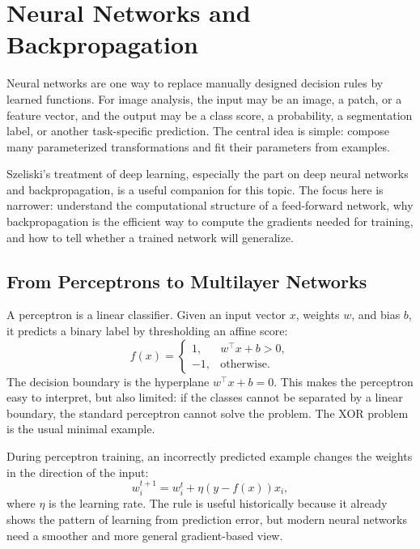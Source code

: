 \section{Neural Networks and Backpropagation}
\label{sec:neural-networks}

Neural networks are one way to replace manually designed decision rules by
learned functions. For image analysis, the input may be an image, a patch, or a
feature vector, and the output may be a class score, a probability, a
segmentation label, or another task-specific prediction. The central idea is
simple: compose many parameterized transformations and fit their parameters
from examples.

Szeliski's treatment of deep learning, especially the part on deep neural
networks and backpropagation, is a useful companion for this topic. The focus
here is narrower: understand the computational structure of a feed-forward
network, why backpropagation is the efficient way to compute the gradients
needed for training, and how to tell whether a trained network will generalize.

\subsection{From Perceptrons to Multilayer Networks}

A perceptron is a linear classifier. Given an input vector $x$, weights $w$,
and bias $b$, it predicts a binary label by thresholding an affine score:
\begin{equation}
  f(x) =
  \begin{cases}
    1, & w^\top x + b > 0,\\
    -1, & \text{otherwise}.
  \end{cases}
\end{equation}
\noindent
The decision boundary is the hyperplane $w^\top x + b = 0$. This makes the
perceptron easy to interpret, but also limited: if the classes cannot be
separated by a linear boundary, the standard perceptron cannot solve the
problem. The XOR problem is the usual minimal example.

During perceptron training, an incorrectly predicted example changes the
weights in the direction of the input:
\begin{equation}
  w_i^{t+1} = w_i^t + \eta\left(y - f(x)\right)x_i ,
\end{equation}
\noindent
where $\eta$ is the learning rate. The rule is useful historically because it
already shows the pattern of learning from prediction error, but modern neural
networks need a smoother and more general gradient-based view.

